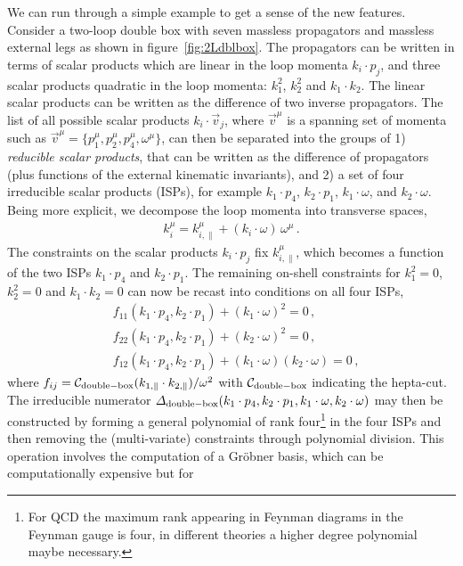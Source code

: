 We can run through a simple example to get a sense of the new features.
Consider a two-loop double box with seven massless propagators and massless external
legs as shown in figure~\ref{fig:2Ldblbox}. The propagators can be written in
terms of scalar products which are linear in the loop momenta $k_i\cdot p_j$, and three
scalar products quadratic in the loop momenta: $k_1^2$, $k_2^2$ and $k_1 \cdot k_2$. The
linear scalar products can be written as the difference of two inverse
propagators. The list of all possible scalar products $k_i \cdot \vec{v}_{j}$, where $\vec{v}^{\mu}$ is a
spanning set of momenta such as $\vec{v}^{\mu} = \{p_1^{\mu},p_2^{\mu},p_4^{\mu},\omega^{\mu}\}$, can then be
separated into the groups of 1) \emph{reducible scalar products}, that can be
written as the difference of propagators (plus functions of the external kinematic invariants), and 2) a set of four
irreducible scalar products (ISPs), for example $k_1\cdot p_4$, $k_2\cdot p_1$, $k_1\cdot\omega$,
and $k_2\cdot\omega$. Being more explicit, we decompose the loop momenta into transverse spaces,
\begin{align}
  k_i^\mu = k^\mu_{i,\parallel} + (k_i\cdot\omega)\,\omega^\mu \,.
\end{align}
The constraints on the scalar products $k_i\cdot p_j$ fix $k^\mu_{i,\parallel}$, which becomes a function of the two ISPs $k_1\cdot p_4$ and $k_2\cdot p_1$.
The remaining on-shell constraints for $k_1^2=0$, $k_2^2=0$ and $k_1 \cdot k_2=0$ can now be recast into conditions on all four ISPs,
\begin{align}
  &f_{11}(k_1\cdot p_4, k_2\cdot p_1) + (k_1\cdot\omega)^2 = 0 \,, \\
  &f_{22}(k_1\cdot p_4, k_2\cdot p_1) + (k_2\cdot\omega)^2 = 0 \,, \\
  &f_{12}(k_1\cdot p_4, k_2\cdot p_1) + (k_1\cdot\omega)(k_2\cdot\omega) = 0 \,,
\end{align}
where $f_{ij} = \mathcal{C}_{\rm double-box}(k_{1,\parallel}\cdot k_{2,\parallel})/\omega^2$ with $\mathcal{C}_{\rm double-box}$ indicating the hepta-cut.
The irreducible numerator $\Delta_{\rm double-box}(k_1\cdot p_4, k_2\cdot p_1,
k_1\cdot\omega, k_2\cdot\omega)$ may then be constructed by forming a general
polynomial of rank four\footnote{For QCD the maximum rank appearing in Feynman
diagrams in the Feynman gauge is four, in different theories a higher degree polynomial maybe necessary.} in the four ISPs and then removing the (multi-variate)
constraints through polynomial division. This operation involves the
computation of a Gr\"{o}bner basis, which can be computationally expensive but for
